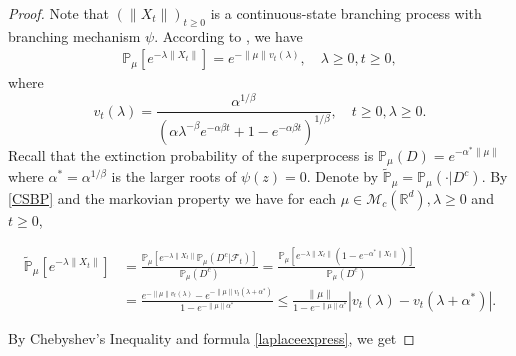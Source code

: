 \documentclass[12pt,oneside,english]{amsart}
\theoremstyle{plain}
\theoremstyle{definition}
\numberwithin{equation}{section}
\begin{document}
\begin{proof}
    Note that $(\|X_t\|)_{t\geq 0}$ is a continuous-state branching process with branching mechanism $\psi$. According to \cite[Example 3.1]{Li2011Measure-valued}, we have
\begin{align}\label{CSBP}
    \mathbb{P}_{\mu} [e^{-\lambda\|X_t\|}]
    =e^{-\|\mu\|v_t(\lambda)},
    \quad \lambda \geq 0, t\geq 0,
\end{align}
    where
\[
    v_t(\lambda)=\frac{\alpha^{1/\beta}}{(\alpha\lambda^{-\beta}e^{-\alpha \beta t}+1-e^{-\alpha \beta t})^{1/\beta}},\quad t\geq 0,\lambda\geq 0.
\]
    Recall that the extinction probability of the superprocess is $\mathbb{P}_{\mu}(D)=e^{-\alpha^*\|\mu\|}$ where $\alpha^*=\alpha^{1/\beta}$ is the larger roots of $\psi(z)=0$.
    Denote by $\mathbb{\tilde{P}}_{\mu}=\mathbb{P}_{\mu}(\cdot|D^c)$.
    By \eqref{CSBP} and the markovian property we have for each $\mu \in \mathcal M_c(\mathbb R^d), \lambda \geq 0$ and
    $t\geq 0$,

\begin{align}
    \label{laplaceexpress}
    \mathbb{\tilde{P}}_{\mu}[e^{-\lambda \|X_t\|}]
    &=\frac{ \mathbb P_\mu[e^{-\lambda \|X_t\| }\mathbb P_\mu(D^c| \mathscr F_t)] }{\mathbb P_\mu(D^c)}
    =\frac{ \mathbb P_\mu[e^{-\lambda \|X_t\| }(1-e^{-\alpha^*\|X_t\|})] }{\mathbb P_\mu(D^c)}
    \\&=\frac{e^{-\|\mu\|v_t(\lambda)}-e^{-\|\mu\|v_t(\lambda+\alpha^*)}}{1-e^{-\|\mu\|\alpha^*}}
    \leq \frac{\|\mu\|}{1-e^{-\|\mu\|\alpha^*}}\left|v_t(\lambda)-v_t(\lambda+\alpha^*)\right|.
\end{align}

By Chebyshev's Inequality and formula \eqref{laplaceexpress}, we get


\end{proof}
\end{document}

